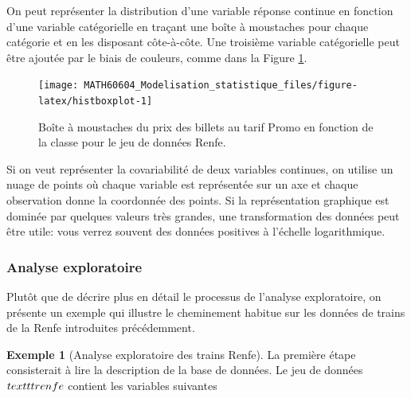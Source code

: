 \documentclass[
  11pt,
  letterpaper,
]{article}
\theoremstyle{definition}
\theoremstyle{definition}
\newtheorem{example}{Exemple}[section]
\theoremstyle{definition}
\theoremstyle{definition}
\theoremstyle{remark}
\begin{document}
On peut représenter la distribution d'une variable réponse continue en fonction d'une variable catégorielle en traçant une boîte à moustaches pour chaque catégorie et en les disposant côte-à-côte. Une troisième variable catégorielle peut être ajoutée par le biais de couleurs, comme dans la Figure \ref{fig:histboxplot}.

\begin{figure}

{\centering \texttt{[image: MATH60604\_Modelisation\_statistique\_files/figure-latex/histboxplot-1]} 

}

\caption{Boîte à moustaches du prix des billets au tarif Promo en fonction de la classe pour le jeu de données Renfe.}\label{fig:histboxplot}
\end{figure}

Si on veut représenter la covariabilité de deux variables continues, on utilise un nuage de points où chaque variable est représentée sur un axe et chaque observation donne la coordonnée des points. Si la représentation graphique est dominée par quelques valeurs très grandes, une transformation des données peut être utile: vous verrez souvent des données positives à l'échelle logarithmique.

\hypertarget{analyse-exploratoire-1}{%
\subsubsection{Analyse exploratoire}\label{analyse-exploratoire-1}}

Plutôt que de décrire plus en détail le processus de l'analyse exploratoire, on présente un exemple qui illustre le cheminement habitue sur les données de trains de la Renfe introduites précédemment.

\begin{example}[Analyse exploratoire des trains Renfe]
\protect\hypertarget{exm:renfe-aed}{}\label{exm:renfe-aed}La première étape consisterait à lire la description de la base de données. Le jeu de données \(\\texttt{renfe}\) contient les variables suivantes
\end{example}
\end{document}
